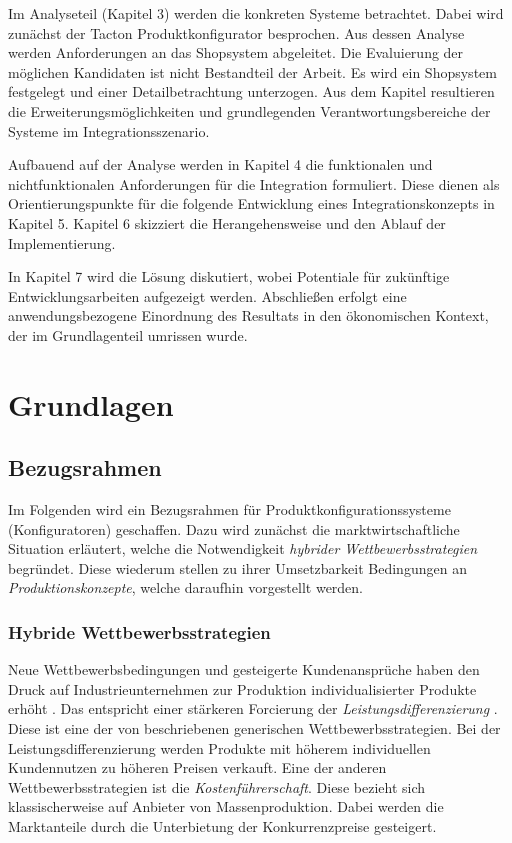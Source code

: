 \documentclass[11pt, a4paper, titlepage, listof=totoc, bibliography=totoc, index=totoc, twoside, openright, headings=normal]{scrreprt}
\begin{document}
Im Analyseteil (Kapitel 3) werden die konkreten Systeme betrachtet. Dabei wird zunächst der Tacton Produktkonfigurator besprochen. Aus dessen Analyse werden Anforderungen an das Shopsystem abgeleitet. Die Evaluierung der möglichen Kandidaten ist nicht Bestandteil der Arbeit. Es wird ein Shopsystem festgelegt und einer Detailbetrachtung unterzogen. Aus dem Kapitel resultieren die Erweiterungsmöglichkeiten und grundlegenden Verantwortungsbereiche der Systeme im Integrationsszenario.

Aufbauend auf der Analyse werden in Kapitel 4 die funktionalen und nichtfunktionalen Anforderungen für die Integration formuliert. Diese dienen als Orientierungspunkte für die folgende Entwicklung eines Integrationskonzepts in Kapitel 5. Kapitel 6 skizziert die Herangehensweise und den Ablauf der Implementierung.

In Kapitel 7 wird die Lösung diskutiert, wobei Potentiale für zukünftige Entwicklungsarbeiten aufgezeigt werden. Abschließen erfolgt eine anwendungsbezogene Einordnung des Resultats in den ökonomischen Kontext, der im Grundlagenteil umrissen wurde.

\chapter{Grundlagen}
\label{Grundlagen}
\section{Bezugsrahmen}
Im Folgenden wird ein Bezugsrahmen für Produktkonfigurationssysteme (Konfiguratoren) geschaffen. Dazu wird zunächst die marktwirtschaftliche Situation erläutert, welche die Notwendigkeit \emph{hybrider Wettbewerbsstrategien} begründet. Diese wiederum stellen zu ihrer Umsetzbarkeit Bedingungen an \emph{Produktionskonzepte}, welche daraufhin vorgestellt werden.

\subsection{Hybride Wettbewerbsstrategien}
\label{oekonomischerBezug}
Neue Wettbewerbsbedingungen und gesteigerte Kundenansprüche haben den Druck auf Industrieunternehmen zur Produktion individualisierter Produkte erhöht \citep{piller98}. Das entspricht einer stärkeren Forcierung der \emph{Leistungsdifferenzierung} \citep{lutz11}. Diese ist eine der von \citet{porter02} beschriebenen \glqq generischen Wettbewerbsstrategien\grqq{}. Bei der Leistungsdifferenzierung werden Produkte mit höherem individuellen Kundennutzen zu höheren Preisen verkauft. Eine der anderen Wettbewerbsstrategien ist die \emph{Kostenführerschaft}. Diese bezieht sich klassischerweise auf Anbieter von Massenproduktion. Dabei werden die Marktanteile durch die Unterbietung der Konkurrenzpreise gesteigert.
\end{document}
